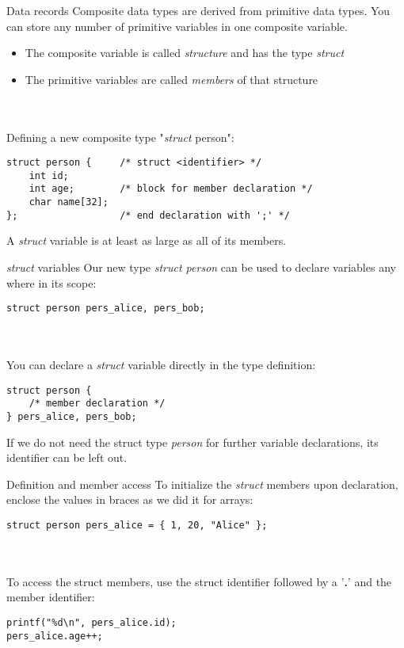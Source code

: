 \begin{frame}[fragile]{Data records}
	Composite data types are derived from primitive data types. You can store any number of primitive variables in one composite variable.
	\begin{itemize}
		\item The composite variable is called \textit{structure} and has the type \textit{struct}
		\item The primitive variables are called \textit{members} of that structure
	\end{itemize} \ \\ \ \\
	Defining a new composite type "\textit{struct} person":
	\begin{lstlisting}[numbers=none]
struct person {		/* struct <identifier> */
	int id;
	int age;		/* block for member declaration */
	char name[32];
};					/* end declaration with ';' */
\end{lstlisting}
	A \textit{struct} variable is at least as large as all of its members.
\end{frame}


\begin{frame}[fragile]{\textit{struct} variables}
	Our new type \textit{struct person} can be used to declare variables any where in its scope:
	\begin{lstlisting}[numbers=none]
struct person pers_alice, pers_bob;
\end{lstlisting} \ \\ \ \\
	You can declare a \textit{struct} variable directly in the type definition:
	\begin{lstlisting}[numbers=none]
struct person {
	/* member declaration */
} pers_alice, pers_bob;
\end{lstlisting}
	If we do not need the struct type \textit{person} for further variable declarations, its identifier can be left out.
\end{frame}


\begin{frame}[fragile]{Definition and member access}
	To initialize the \textit{struct} members upon declaration, enclose the values in braces as we did it for arrays:
	\begin{lstlisting}[numbers=none]
struct person pers_alice = { 1, 20, "Alice" };
\end{lstlisting} \ \\ \ \\
	To access the struct members, use the struct identifier followed by a '\textbf{.}' and the member identifier:
	\begin{lstlisting}[numbers=none]
printf("%d\n", pers_alice.id);
pers_alice.age++;
\end{lstlisting}
\end{frame}

